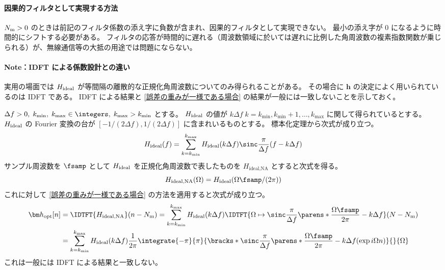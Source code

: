            \paragraph{因果的フィルタとして実現する方法}
                ${N_\text{m}}>0$ のときは前記のフィルタ係数の添え字に負数が含まれ、因果的フィルタとして実現できない。
                最小の添え字が 0 になるように時間的にシフトする必要がある。
                フィルタの応答が時間的に遅れる（周波数領域に於いては遅れに比例した角周波数の複素指数関数が乗じられる）が、無線通信等の大抵の用途では問題にならない。
            \paragraph{Note：IDFT による係数設計との違い}
                \newcommand{\kmin}{{k_\text{min}}}
                \newcommand{\kmax}{{k_\text{max}}}
                \newcommand{\HidealNA}{H_\text{ideal,NA}}
                実用の場面では $H_\text{ideal}$ が等間隔の離散的な正規化角周波数についてのみ得られることがある。
                その場合に $\bm{h}$ の決定によく用いられているのは IDFT である。
                IDFT による結果と \ref{誤差の重みが一様である場合} の結果が一般には一致しないことを示しておく。
                \par
                $\Delta f>0,\;\kmin,\;\kmax\in\integers,\;\kmax>\kmin$ とする。
                $H_\text{ideal}$ の値が $k\Delta f\;k=\kmin,\kmin+1,\dots,\kmax$ に関して得られているとする。
                $H_\text{ideal}$ の Fourier 変換の台が $[-1/(2\Delta f),1/(2\Delta f)]$ に含まれいるものとする。
                標本化定理から次式が成り立つ。
                \[ \Hideal(f) = \sum_{k=\kmin}^\kmax \Hideal(k\Delta f)\sinc\frac{\pi}{\Delta f}(f-k\Delta f) \]
                サンプル周波数を $\fsamp$ として $H_\text{ideal}$ を正規化角周波数で表したものを $\HidealNA$ とすると次式を得る。
                \[ \HidealNA(\Omega) = \Hideal(\Omega\fsamp/(2\pi)) \]
                これに対して \ref{誤差の重みが一様である場合} の方法を適用すると次式が成り立つ。
                \begin{align*}
                    \vhOpt[n] &= \IDTFT{\HidealNA}(n-\Nm) = \sum_{k=\kmin}^\kmax \Hideal(k\Delta f)\IDTFT{\Omega\mapsto\sinc\frac{\pi}{\Delta f}\parens*{\frac{\Omega\fsamp}{2\pi}-k\Delta f}}(N-\Nm) \\
                    &= \sum_{k=\kmin}^\kmax \Hideal(k\Delta f)\frac{1}{2\pi}\integrate{-\pi}{\pi}{\bracks*{\sinc\frac{\pi}{\Delta f}\parens*{\frac{\Omega\fsamp}{2\pi}-k\Delta f}}(\exp i\Omega n)}{}{\Omega}
                \end{align*}
                これは一般には IDFT による結果と一致しない。
